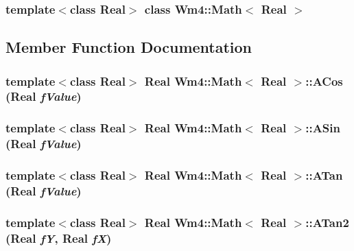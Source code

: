 \subsubsection*{template$<$class Real$>$ class Wm4::Math$<$ Real $>$}



\subsection{Member Function Documentation}
\subsubsection{\setlength{\rightskip}{0pt plus 5cm}template$<$class Real$>$ Real {\bf Wm4::Math}$<$ Real $>$::ACos (Real {\em f\-Value})\hspace{0.3cm}{\tt  [static]}}\label{classWm4_1_1Math_5a99eeb1bbcc52532f7512b596f46fee}


\subsubsection{\setlength{\rightskip}{0pt plus 5cm}template$<$class Real$>$ Real {\bf Wm4::Math}$<$ Real $>$::ASin (Real {\em f\-Value})\hspace{0.3cm}{\tt  [static]}}\label{classWm4_1_1Math_f0cc4c16dcefcf9535405cef650eab79}


\subsubsection{\setlength{\rightskip}{0pt plus 5cm}template$<$class Real$>$ Real {\bf Wm4::Math}$<$ Real $>$::ATan (Real {\em f\-Value})\hspace{0.3cm}{\tt  [static]}}\label{classWm4_1_1Math_d8797e64583fc1536d14460d4aa5a35d}


\subsubsection{\setlength{\rightskip}{0pt plus 5cm}template$<$class Real$>$ Real {\bf Wm4::Math}$<$ Real $>$::ATan2 (Real {\em f\-Y}, Real {\em f\-X})\hspace{0.3cm}{\tt  [static]}}\label{classWm4_1_1Math_12ff5ddc580d5a69f291ee9901242b8b}


